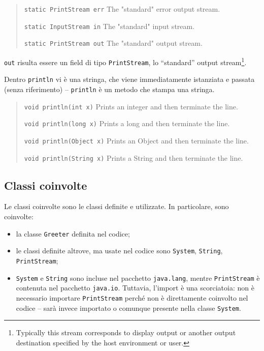 \documentclass[\fontsizeclass,twocolumn]{\classname}
\theoremstyle{definition}
\theoremstyle{definition}
\begin{document}
\begin{quote}
    \footnotesize{\texttt{static PrintStream 	err} The "standard" error output stream.

    \texttt{static InputStream 	in} The "standard" input stream.

    \texttt{static PrintStream 	out} The "standard" output stream.
    }
\end{quote}

\texttt{out} risulta essere un field di tipo \texttt{PrintStream}, lo
``standard'' output stream\footnote{Typically this stream corresponds to
display output or another output destination specified by the host environment
or user.}.


Dentro \texttt{println} vi è una stringa, che viene immediatamente istanziata e
passata (senza riferimento) \--- \texttt{println} è un metodo che stampa una
stringa.


\begin{quote}
    \footnotesize{\texttt{void 	println(int x)} 	Prints an integer and then terminate the line.

    \texttt{void 	println(long x)} 	Prints a long and then terminate the line.

    \texttt{void 	println(Object x)} 	Prints an Object and then terminate the line.

    \texttt{void 	println(String x)} 	Prints a String and then terminate the line.
    }
\end{quote}

\subsection{Classi coinvolte}

Le classi coinvolte sono le classi definite e utilizzate. In particolare, sono coinvolte:
\begin{itemize}
    \item la classe \texttt{Greeter} definita nel codice;
    \item le classi definite altrove, ma usate nel codice sono \texttt{System},
        \texttt{String}, \texttt{PrintStream};
    \item \texttt{System} e \texttt{String} sono incluse nel pacchetto
        \texttt{java.lang}, mentre \texttt{PrintStream} è contenuta nel
        pacchetto \texttt{java.io}. Tuttavia, l'import è una scorciatoia: non è
        necessario importare \texttt{PrintStream} perché non è direttamente
        coinvolto nel codice \--- sarà invece importato o comunque presente
        nella classe \texttt{System}.
\end{itemize}
\end{document}
